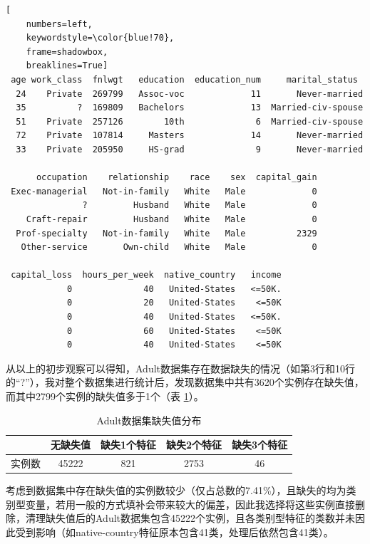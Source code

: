 \documentclass[12pt,a4paper]{article}
\theoremstyle{definition}
\begin{document}
\vspace{0.015\linewidth}
	\begin{lstlisting}[
	numbers=left,
	keywordstyle=\color{blue!70},
	frame=shadowbox,
	breaklines=True]
 age work_class  fnlwgt   education  education_num     marital_status
  24    Private  269799   Assoc-voc             11       Never-married   
  35          ?  169809   Bachelors             13  Married-civ-spouse   
  51    Private  257126        10th              6  Married-civ-spouse   
  72    Private  107814     Masters             14       Never-married   
  33    Private  205950     HS-grad              9       Never-married   

      occupation    relationship    race    sex  capital_gain
 Exec-managerial   Not-in-family   White   Male             0   
               ?         Husband   White   Male             0   
    Craft-repair         Husband   White   Male             0   
  Prof-specialty   Not-in-family   White   Male          2329   
   Other-service       Own-child   White   Male             0   

 capital_loss  hours_per_week  native_country   income  
            0              40   United-States   <=50K.  
            0              20   United-States    <=50K
            0              40   United-States   <=50K.  
            0              60   United-States    <=50K  
            0              40   United-States    <=50K   
	\end{lstlisting}
	
\vspace{0.02\linewidth}
从以上的初步观察可以得知，Adult数据集存在数据缺失的情况（如第3行和10行的“?”），我对整个数据集进行统计后，发现数据集中共有3620个实例存在缺失值，而其中2799个实例的缺失值多于1个（表 \ref{tab:nan}）。

\begin{table}[H]
	\renewcommand\arraystretch{1.35}
	\caption{Adult数据集缺失值分布}
	\label{tab:nan}
	\centering
	
	\begin{tabular}{c|c|c|c|c}
		\centering
		 & 无缺失值 & 缺失1个特征 & 缺失2个特征 & 缺失3个特征 \\
		\hline

		实例数 & 45222 & 821 & 2753 & 46 \\

	\end{tabular}
\end{table}

\vspace{0.01\linewidth}
考虑到数据集中存在缺失值的实例数较少（仅占总数的7.41\%），且缺失的均为类别型变量，若用一般的方式填补会带来较大的偏差，因此我选择将这些实例直接删除，清理缺失值后的Adult数据集包含45222个实例，且各类别型特征的类数并未因此受到影响（如native-country特征原本包含41类，处理后依然包含41类）。
\end{document}
